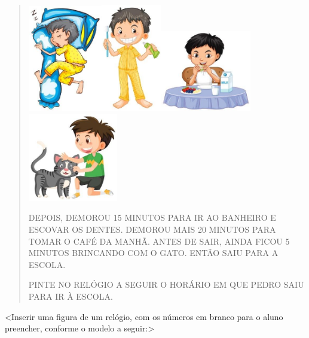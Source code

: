 \begin{quote}
\includegraphics[width=1.27248in,height=1.83120in]{media/image40.jpg}\includegraphics[width=1.04250in,height=1.85399in]{media/image41.jpg}\includegraphics[width=1.54748in,height=1.39171in]{media/image42.jpg}\includegraphics[width=1.54490in,height=1.51274in]{media/image43.jpg}

DEPOIS, DEMOROU 15 MINUTOS PARA IR AO BANHEIRO E ESCOVAR OS DENTES.
DEMOROU MAIS 20 MINUTOS PARA TOMAR O CAFÉ DA MANHÃ. ANTES DE SAIR,
AINDA FICOU 5 MINUTOS BRINCANDO COM O GATO. ENTÃO SAIU PARA A ESCOLA.

PINTE NO RELÓGIO A SEGUIR O HORÁRIO EM QUE PEDRO SAIU PARA IR À ESCOLA.
\end{quote}

\textless{}Inserir uma figura de um relógio, com os números em branco
para o aluno preencher, conforme o modelo a seguir:\textgreater{}


